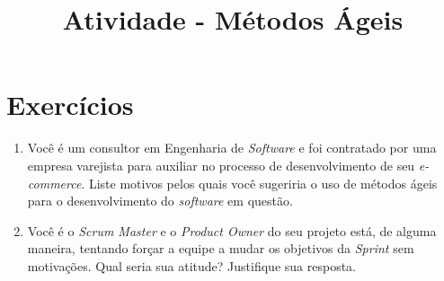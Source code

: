 \documentclass[12pt,a4paper]{article}
\title{Atividade - Métodos Ágeis}
\author{}
\date{}
\begin{document}
   \maketitle
   \section*{Exercícios}
      \begin{enumerate}
         \item Você é um consultor em Engenharia de \textit{Software} e foi contratado por uma empresa varejista para auxiliar no processo de desenvolvimento de seu \textit{e-commerce}. Liste motivos pelos quais você sugeriria o uso de métodos ágeis para o desenvolvimento do \textit{software} em questão.
         \item Você é o \textit{Scrum Master} e o \textit{Product Owner} do seu projeto está, de alguma maneira, tentando forçar a equipe a mudar os objetivos da \textit{Sprint} sem motivações. Qual seria sua atitude? Justifique sua resposta.  
      \end{enumerate}
      
\end{document}
